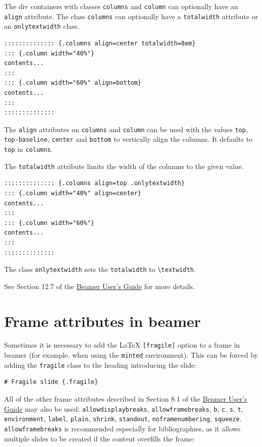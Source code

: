 \documentclass[
  b5paper
]{book}
\begin{document}
The div containers with classes \texttt{columns} and \texttt{column} can
optionally have an \texttt{align} attribute. The class \texttt{columns}
can optionally have a \texttt{totalwidth} attribute or an
\texttt{onlytextwidth} class.

\begin{verbatim}
:::::::::::::: {.columns align=center totalwidth=8em}
::: {.column width="40%"}
contents...
:::
::: {.column width="60%" align=bottom}
contents...
:::
::::::::::::::
\end{verbatim}

The \texttt{align} attributes on \texttt{columns} and \texttt{column}
can be used with the values \texttt{top}, \texttt{top-baseline},
\texttt{center} and \texttt{bottom} to vertically align the columns. It
defaults to \texttt{top} in \texttt{columns}.

The \texttt{totalwidth} attribute limits the width of the columns to the
given value.

\begin{verbatim}
:::::::::::::: {.columns align=top .onlytextwidth}
::: {.column width="40%" align=center}
contents...
:::
::: {.column width="60%"}
contents...
:::
::::::::::::::
\end{verbatim}

The class \texttt{onlytextwidth} sets the \texttt{totalwidth} to
\texttt{\textbackslash{}textwidth}.

See Section 12.7 of the
\href{http://mirrors.ctan.org/macros/latex/contrib/beamer/doc/beameruserguide.pdf}{Beamer
User's Guide} for more details.

\section{Frame attributes in beamer}\label{frame-attributes-in-beamer}

Sometimes it is necessary to add the LaTeX \texttt{{[}fragile{]}} option
to a frame in beamer (for example, when using the \texttt{minted}
environment). This can be forced by adding the \texttt{fragile} class to
the heading introducing the slide:

\begin{verbatim}
# Fragile slide {.fragile}
\end{verbatim}

All of the other frame attributes described in Section 8.1 of the
\href{http://mirrors.ctan.org/macros/latex/contrib/beamer/doc/beameruserguide.pdf}{Beamer
User's Guide} may also be used: \texttt{allowdisplaybreaks},
\texttt{allowframebreaks}, \texttt{b}, \texttt{c}, \texttt{s},
\texttt{t}, \texttt{environment}, \texttt{label}, \texttt{plain},
\texttt{shrink}, \texttt{standout}, \texttt{noframenumbering},
\texttt{squeeze}. \texttt{allowframebreaks} is recommended especially
for bibliographies, as it allows multiple slides to be created if the
content overfills the frame:
\end{document}
